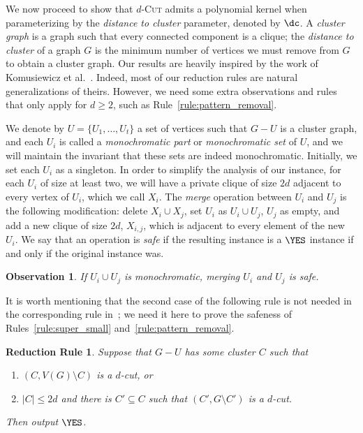 \documentclass[a4paper,UKenglish,cleveref, autoref]{lipics-v2019}
\newcommand{\ig}[1]{\textcolor{red}{[Ig: #1]}}
\newtheorem{rrule}{Reduction Rule}
\newtheorem{observation}{Observation}
\newcommand{\pname}[1]{\textsc{#1}}
\newcommand{\tdef}[1]{\emph{#1}}
\begin{document}
We now proceed to show that \pname{$d$-Cut} admits a polynomial kernel when parameterizing by the \tdef{distance to cluster} parameter, denoted by $\dc$.
A \tdef{cluster graph} is a graph such that every connected component is a clique; the \emph{distance to cluster} of a graph $G$ is the minimum number of vertices we must remove from $G$ to obtain a cluster graph.
Our results are heavily inspired by the work of Komusiewicz et al.~\cite{matching_cut_ipec}.
Indeed, most of our reduction rules are natural generalizations of theirs. However, we need some extra observations and rules that only apply for $d \geq 2$, such as Rule~\ref{rule:pattern_removal}.



We denote by $U = \{U_1, \dots, U_t\}$ a set of vertices such that $G - U$ is a cluster graph, and each $U_i$ is called a \tdef{monochromatic part} or \tdef{monochromatic set} of $U$, and we will maintain the invariant that these sets are indeed monochromatic. Initially, we set each $U_i$ as a singleton.
In order to simplify the analysis of our instance, for each $U_i$ of size at least two, we will have a private clique of size $2d$ adjacent to every vertex of $U_i$, which we call $X_i$.
The \tdef{merge} operation between $U_i$ and $U_j$ is the following modification: delete $X_i \cup X_j$, set $U_i$ as $U_i \cup U_j$, $U_j$ as empty, and add a new clique of size $2d$, $X_{i,j}$, which is adjacent to every element of the new $U_i$.
We say that an operation is \textit{safe} if the resulting instance  is a $\YES$ instance if and only if the original instance was.

\begin{observation}
    If $U_i \cup U_j$ is monochromatic, merging $U_i$ and $U_j$ is safe.
\end{observation}


It is worth mentioning that the second case of the following rule is not needed in the corresponding rule in~\cite{matching_cut_ipec}; we need it here to prove the safeness of Rules~\ref{rule:super_small} and~\ref{rule:pattern_removal}.

\begin{rrule}
    \label{rule:trivial}
    Suppose that $G - U$ has some cluster $C$ such that
    \begin{enumerate}
        \item $(C, V(G) \setminus C)$ is a $d$-cut, or
        \item $|C| \leq 2d$ and there is $C' \subseteq C$ such that $(C', G \setminus C')$ is a $d$-cut.
    \end{enumerate}
    Then output $\YES$.
\end{rrule}
\end{document}
